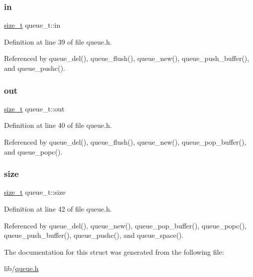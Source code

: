 \mbox{\label{structqueue__t_a7a6832e36c70a1db7fddc93fb6be9d63}} 
\subsubsection{\texorpdfstring{in}{in}}
{\footnotesize\ttfamily \hyperlink{user__config_8h_aea0c7eab1ce1eebb4e879ef4e23c16ee}{size\+\_\+t} queue\+\_\+t\+::in}



Definition at line 39 of file queue.\+h.



Referenced by queue\+\_\+del(), queue\+\_\+flush(), queue\+\_\+new(), queue\+\_\+push\+\_\+buffer(), and queue\+\_\+pushc().

\mbox{\label{structqueue__t_a8f6e1c623d2ceed398a71a0aab93b0fa}} 
\subsubsection{\texorpdfstring{out}{out}}
{\footnotesize\ttfamily \hyperlink{user__config_8h_aea0c7eab1ce1eebb4e879ef4e23c16ee}{size\+\_\+t} queue\+\_\+t\+::out}



Definition at line 40 of file queue.\+h.



Referenced by queue\+\_\+del(), queue\+\_\+flush(), queue\+\_\+new(), queue\+\_\+pop\+\_\+buffer(), and queue\+\_\+popc().

\mbox{\label{structqueue__t_a83a13b888f9d4ef127d706559818b779}} 
\subsubsection{\texorpdfstring{size}{size}}
{\footnotesize\ttfamily \hyperlink{user__config_8h_aea0c7eab1ce1eebb4e879ef4e23c16ee}{size\+\_\+t} queue\+\_\+t\+::size}



Definition at line 42 of file queue.\+h.



Referenced by queue\+\_\+del(), queue\+\_\+new(), queue\+\_\+pop\+\_\+buffer(), queue\+\_\+popc(), queue\+\_\+push\+\_\+buffer(), queue\+\_\+pushc(), and queue\+\_\+space().



The documentation for this struct was generated from the following file\+:\begin{DoxyCompactItemize}
\item 
lib/\hyperlink{queue_8h}{queue.\+h}\end{DoxyCompactItemize}
